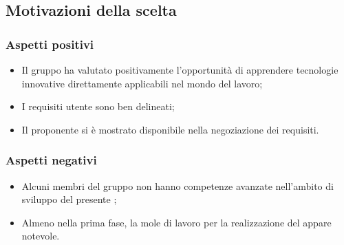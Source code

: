 \subsection{Motivazioni della scelta}
\subsubsection{Aspetti positivi}
\begin{itemize}
\item Il gruppo ha valutato positivamente l'opportunit\`a di apprendere tecnologie innovative
  direttamente applicabili nel mondo del lavoro;
\item I requisiti utente sono ben delineati;
\item Il proponente si \`e mostrato disponibile nella negoziazione dei requisiti.
\end{itemize}

\subsubsection{Aspetti negativi}
\begin{itemize}
\item Alcuni membri del gruppo non hanno competenze avanzate nell'ambito di sviluppo del presente ;
\item Almeno nella prima fase, la mole di lavoro per la realizzazione del  appare notevole.
\end{itemize}



